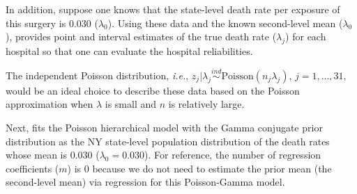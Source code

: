 \documentclass[article]{jss}
\begin{document}
In addition, suppose one knows that the state-level death rate per exposure of this surgery is 0.030 ($\lambda_{0}$). Using these data and the known second-level mean ($\lambda_{0}$),  provides point and interval estimates of the true death rate ($\lambda_{j}$) for each hospital so that one can evaluate the hospital reliabilities. 


The independent Poisson distribution, \emph{i.e.},  $z_{j}\vert \lambda_{j}\stackrel{ind}{\sim} \textrm{Poisson}(n_{j}\lambda_{j})$, $j=1, \ldots, 31,$ would be an ideal choice to describe these data based on the Poisson approximation when $\lambda$ is small and $n$ is relatively large. 


Next,  fits the Poisson hierarchical model with the Gamma conjugate prior distribution as the NY state-level population distribution of the death rates whose mean is 0.030 ($\lambda_{0}=0.030$). For reference, the number of regression coefficients ($m$) is 0 because we do not need to estimate the prior mean (the second-level mean) via regression for this Poisson-Gamma model. 
\end{document}
